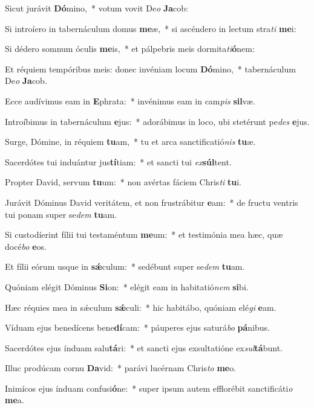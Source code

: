 \item Sicut jurávit \textbf{Dó}mino,~* votum vovit De\textit{o} \textbf{Ja}cob:
\item Si introíero in tabernáculum domus \textbf{me}æ,~* si ascéndero in lectum stra\textit{ti} \textbf{me}i:
\item Si dédero somnum óculis \textbf{me}is,~* et pálpebris meis dormita\textit{ti}\textbf{ó}nem:
\item Et réquiem tempóribus meis: donec invéniam locum \textbf{Dó}mino,~* tabernáculum De\textit{o} \textbf{Ja}cob.
\item Ecce audívimus eam in \textbf{E}phrata:~* invénimus eam in cam\textit{pis} \textbf{sil}væ.
\item Introíbimus in tabernáculum \textbf{e}jus:~* adorábimus in loco, ubi stetérunt pe\textit{des} \textbf{e}jus.
\item Surge, Dómine, in réquiem \textbf{tu}am,~* tu et arca sanctificatió\textit{nis} \textbf{tu}æ.
\item Sacerdótes tui induántur jus\textbf{tí}tiam:~* et sancti tui \textit{ex}\textbf{súl}tent.
\item Propter David, servum \textbf{tu}um:~* non avértas fáciem Chris\textit{ti} \textbf{tu}i.
\item Jurávit Dóminus David veritátem, et non frustrábitur \textbf{e}am:~* de fructu ventris tui ponam super se\textit{dem} \textbf{tu}am.
\item Si custodíerint fílii tui testaméntum \textbf{me}um:~* et testimónia mea hæc, quæ docé\textit{bo} \textbf{e}os.
\item Et fílii eórum usque in \textbf{sǽ}culum:~* sedébunt super se\textit{dem} \textbf{tu}am.
\item Quóniam elégit Dóminus \textbf{Si}on:~* elégit eam in habitatió\textit{nem} \textbf{si}bi.
\item Hæc réquies mea in sǽculum \textbf{sǽ}culi:~* hic habitábo, quóniam elé\textit{gi} \textbf{e}am.
\item Víduam ejus benedícens bene\textbf{dí}cam:~* páuperes ejus saturá\textit{bo} \textbf{pá}nibus.
\item Sacerdótes ejus índuam salu\textbf{tá}ri:~* et sancti ejus exsultatióne ex\textit{sul}\textbf{tá}bunt.
\item Illuc prodúcam cornu \textbf{Da}vid:~* parávi lucérnam Chris\textit{to} \textbf{me}o.
\item Inimícos ejus índuam confusi\textbf{ó}ne:~* super ipsum autem efflorébit sanctificáti\textit{o} \textbf{me}a.
